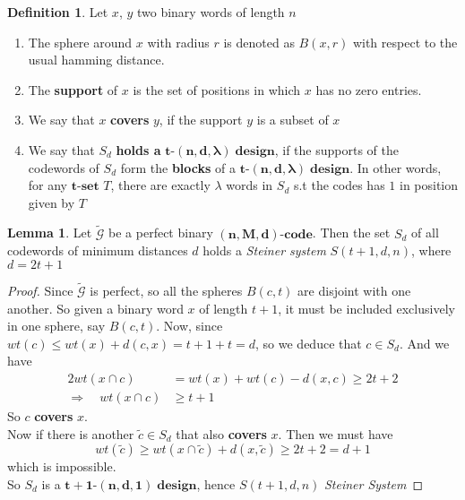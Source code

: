 \documentclass[12pt]{article}
\theoremstyle{definition}
\newtheorem{lemma}[theorem]{Lemma}
\newtheorem{definition}[theorem]{Definition}
\numberwithin{equation}{theorem}
\numberwithin{figure}{theorem}
\newcommand{\tParamDesign}[4]{\ensuremath{\bm{#1\mbox{-}(#2,#3,#4)\; design}}}
\newcommand{\steinerSystem}[3]{\ensuremath{{S(#1,#2,#3)}}}
\newcommand{\pluralMyBlock}{\textbf{blocks}}
\newcommand{\cCodes}{\ensuremath{\widetilde{\mathcal{G}}}}
\newcommand{\tSet}[1]{\ensuremath{\bm{#1\mbox{-}{set}}}}
\newcommand{\code}[3]{\ensuremath{\bm{(#1,#2,#3)\mbox{-}code}}}
\begin{document}
\begin{definition}\label{coverSupportHoldDefinition}
	Let $x$, $y$ two binary words of length $n$
	\begin{enumerate}
		\item The sphere around $x$ with radius $r$ is denoted as $B(x,r)$ with respect to the usual hamming distance.
		\item The \textbf{support} of $x$ is the set of positions in which $x$ has no zero entries.
		\item We say that $x$ \textbf{covers} $y$, if the support $y$ is a subset of $x$
		\item We say that $S_d$ \textbf{holds a } {\tParamDesign{t}{n}{d}{\lambda}}, if the supports of the codewords of $S_d$ form the {\pluralMyBlock} of a {\tParamDesign{t}{n}{d}{\lambda}}. In other words, for any {\tSet{t}} $T$, there are exactly $\lambda$ words in $S_d$ s.t the codes has $1$ in position given by $T$
	\end{enumerate}
\end{definition}

\begin{lemma}\label{perfectCdDesign}
Let {\cCodes} be a perfect binary {\code{n}{M}{d}}. Then the set $S_d$ of all codewords of minimum distances $d$ holds a \emph{Steiner system} \steinerSystem{t+1}{d}{n}, where $d = 2t + 1$
\end{lemma}

\begin{proof}
Since {\cCodes} is perfect, so all the spheres $B(c,t)$ are disjoint with one another. So given a binary word $x$ of length $t+1$, it must be included exclusively in one sphere, say $B(c,t)$. Now, since $wt(c) \leq wt(x) + d(c,x) = t + 1 + t = d$, so we deduce that $c \in S_d$. And we have
\begin{align*}
	2wt(x \cap c) &= wt(x) + wt(c) - d(x,c) \geq 2t+2 \\
	\Rightarrow \quad wt(x\cap c) &\geq t + 1
\end{align*}
So $c$ \textbf{covers} $x$. \\
Now if there is another $\tilde{c} \in S_d$ that also \textbf{covers} $x$. Then we must have 
\[
	wt(\tilde{c}) \geq wt(x\cap \tilde{c}) + d(x,\tilde{c}) \geq 2t + 2 = d + 1
\]
 which is impossible. \\
So $S_d$ is a \tParamDesign{t+1}{n}{d}{1}, hence \steinerSystem{t+1}{d}{n} \emph{Steiner System}
\end{proof}
\end{document}
